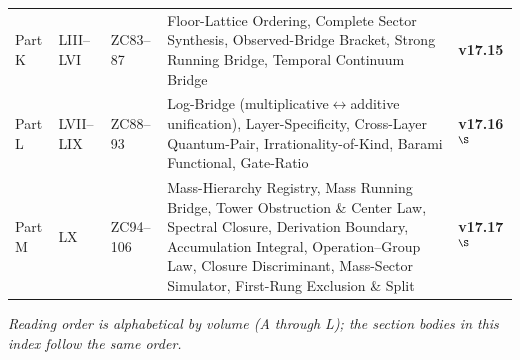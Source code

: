 \documentclass[11pt, a4paper]{article}
\begin{document}
{\begin{tabular}{@{}llp{1.9cm}p{5.4cm}l@{}}
Part K & LIII--LVI & ZC83--87 & Floor-Lattice Ordering, Complete Sector Synthesis, Observed-Bridge Bracket, Strong Running Bridge, Temporal Continuum Bridge & \textbf{v17.15} \\
Part L & LVII--LIX & ZC88--93 & Log-Bridge (multiplicative$\leftrightarrow$additive unification), Layer-Specificity, Cross-Layer Quantum-Pair, Irrationality-of-Kind, Barami Functional, Gate-Ratio & \textbf{v17.16}$^{\S}$ \\
Part M & LX & ZC94--106 & Mass-Hierarchy Registry, Mass Running Bridge, Tower Obstruction \& Center Law, Spectral Closure, Derivation Boundary, Accumulation Integral, Operation--Group Law, Closure Discriminant, Mass-Sector Simulator, First-Rung Exclusion \& Split & \textbf{v17.17}$^{\S}$ \\
\bottomrule
\end{tabular}
}

\smallskip
\noindent\textit{Reading order is alphabetical by volume (A through L);
the section bodies in this index follow the same order.}
\end{document}

